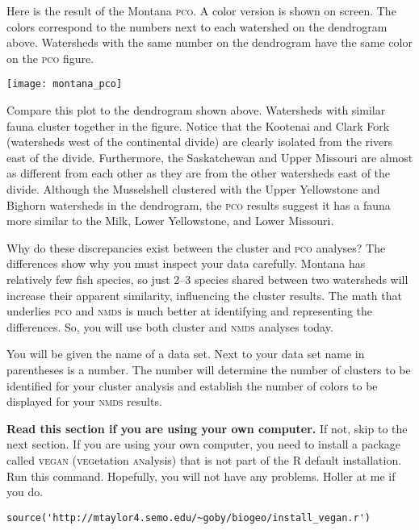 \documentclass[11pt]{article}
\begin{document}
Here is the result of the Montana \textsc{pco}. A 
color version is shown on screen. The colors correspond to the numbers next to each
watershed on the dendrogram above. Watersheds with the same number on the dendrogram
have the same color on the \textsc{pco} figure.

\begin{center}
	\texttt{[image: montana\_pco]}
\end{center}

Compare this plot to the dendrogram shown above. Watersheds with similar fauna cluster
together in the figure. Notice that the Kootenai and Clark Fork (watersheds west of the 
continental divide) are clearly isolated from the rivers east of the divide. Furthermore, 
the Saskatchewan and Upper Missouri are almost as different from each other as they are 
from the other watersheds east of the divide. Although the Musselshell clustered with the 
Upper Yellowstone and Bighorn watersheds in the dendrogram, the \textsc{pco} results 
suggest it has a fauna more similar to the Milk, Lower Yellowstone, and Lower Missouri.

Why do these discrepancies exist between the cluster and \textsc{pco} analyses? The
differences show why you must inspect your data carefully. Montana has relatively few fish
species, so just 2--3 species shared between two watersheds will increase their apparent similarity, 
influencing the cluster results. The math that underlies \textsc{pco} and \textsc{nmds}
is much better at identifying and representing the differences. So, you will use both cluster and \textsc{nmds} analyses
today.

You will be given the name of a data set. Next to your data set name in parentheses is a number.
The number will determine  the number of clusters to be identified for your cluster analysis and establish the number
of colors to be displayed for your \textsc{nmds} results.

\textbf{Read this section if you are using your own computer.} If not, skip to the next section. 
If you are using your own computer, you need to install a package called \textsc{vegan} (\textsc{veg}etation
\textsc{an}alysis) that is not part of the R default installation. Run this command.  Hopefully, you will not have any problems. Holler at me if you do.

\begin{verbatim}
source('http://mtaylor4.semo.edu/~goby/biogeo/install_vegan.r')
\end{verbatim}
\end{document}
